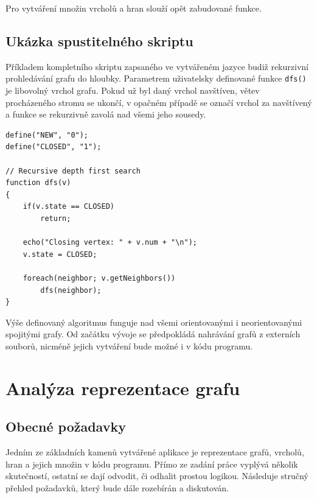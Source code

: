 \documentclass[11pt,twoside,a4paper]{book}
\begin{document}
Pro vytváření množin vrcholů a hran slouží opět zabudované funkce.


\subsection{Ukázka spustitelného skriptu}

Příkladem kompletního skriptu zapsaného ve vytvářeném jazyce budiž rekurzivní pro\-hle\-dá\-vá\-ní grafu do hloubky. Parametrem uživatelsky definované funkce \texttt{dfs()} je libovolný vrchol grafu. Pokud už byl daný vrchol navštíven, větev procházeného stromu se ukončí, v opačném případě se označí vrchol za navštívený a funkce se rekurzivně zavolá nad všemi jeho sousedy.

\begin{verbatim}
define("NEW", "0");
define("CLOSED", "1");

// Recursive depth first search
function dfs(v)
{
    if(v.state == CLOSED)
        return;

    echo("Closing vertex: " + v.num + "\n");
    v.state = CLOSED;

    foreach(neighbor; v.getNeighbors())
        dfs(neighbor);
}
\end{verbatim}


Výše definovaný algoritmus funguje nad všemi orientovanými i neorientovanými spojitými grafy. Od začátku vývoje se předpokládá nahrávání grafů z externích souborů, nicméně jejich vytváření bude možné i v kódu programu.


\section{Analýza reprezentace grafu}

\subsection{Obecné požadavky}

Jedním ze základních kamenů vytvářené aplikace je reprezentace grafů, vrcholů, hran a jejich množin v kódu programu. Přímo ze zadání práce vyplývá několik skutečností, ostatní se dají odvodit, či odhalit prostou logikou. Následuje stručný přehled požadavků, který bude dále rozebírán a diskutován.
\end{document}
